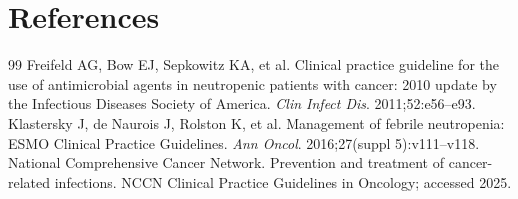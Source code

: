 \section*{References}
\begin{thebibliography}{99}
 Freifeld AG, Bow EJ, Sepkowitz KA, et al. Clinical practice guideline for the use of antimicrobial agents in neutropenic patients with cancer: 2010 update by the Infectious Diseases Society of America. \textit{Clin Infect Dis}. 2011;52:e56--e93.
 Klastersky J, de Naurois J, Rolston K, et al. Management of febrile neutropenia: ESMO Clinical Practice Guidelines. \textit{Ann Oncol}. 2016;27(suppl 5):v111--v118.
 National Comprehensive Cancer Network. Prevention and treatment of cancer-related infections. NCCN Clinical Practice Guidelines in Oncology; accessed 2025.
\end{thebibliography}
